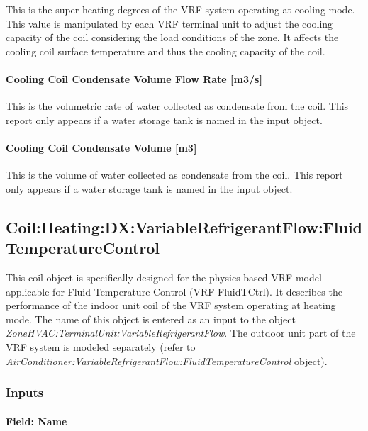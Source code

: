 This is the super heating degrees of the VRF system operating at cooling mode. This value is manipulated by each VRF terminal unit to adjust the cooling capacity of the coil considering the load conditions of the zone. It affects the cooling coil surface temperature and thus the cooling capacity of the coil.

\paragraph{Cooling Coil Condensate Volume Flow Rate {[}m3/s{]}}\label{cooling-coil-condensate-volume-flow-rate-m3s-2}

This is the volumetric rate of water collected as condensate from the coil. This report only appears if a water storage tank is named in the input object.

\paragraph{Cooling Coil Condensate Volume {[}m3{]}}\label{cooling-coil-condensate-volume-m3-2}

This is the volume of water collected as condensate from the coil. This report only appears if a water storage tank is named in the input object.

\subsection{Coil:Heating:DX:VariableRefrigerantFlow:FluidTemperatureControl}\label{coilheatingdxvariablerefrigerantflowfluidtemperaturecontrol}

This coil object is specifically designed for the physics based VRF model applicable for Fluid Temperature Control (VRF-FluidTCtrl). It describes the performance of the indoor unit coil of the VRF system operating at heating mode. The name of this object is entered as an input to the object \emph{ZoneHVAC:TerminalUnit:VariableRefrigerantFlow}. The outdoor unit part of the VRF system is modeled separately (refer to \emph{AirConditioner:VariableRefrigerantFlow:FluidTemperatureControl} object).

\subsubsection{Inputs}\label{inputs-9-007}

\paragraph{Field: Name}\label{field-name-8-006}

